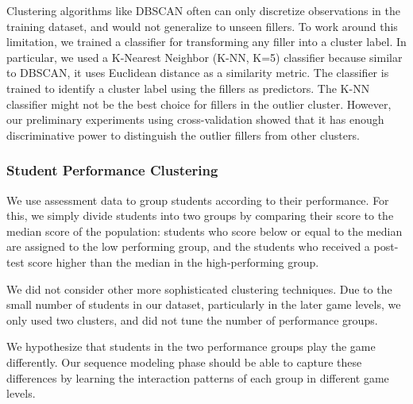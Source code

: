 \documentclass{sigchi}
\begin{document}
	Clustering algorithms like DBSCAN often can only discretize observations in the training dataset, and would not generalize to unseen fillers.
	To work around this limitation, we trained a classifier for transforming any filler into a cluster label. 
	In particular, we used a K-Nearest Neighbor (K-NN, K=5) classifier because similar to DBSCAN, it uses Euclidean distance as a similarity metric.
	The classifier is trained to identify a cluster label using the fillers as predictors.
	The K-NN classifier might not be the best choice for fillers in the outlier cluster. 
	However, our preliminary experiments using cross-validation showed that it has enough discriminative power to distinguish the outlier fillers from other clusters.
	
	\subsubsection{Student Performance Clustering}
	\label{sec:student_disc}

We use assessment data to group students according to their performance.
For this, we simply  divide students into two groups by comparing their score to the median score of the population:
 students who score below or equal to the median are assigned to the low performing group, and the students who received a post-test score higher than the median in the high-performing group.
 
We did not consider other more sophisticated clustering techniques.
Due to the small number of students in our dataset, particularly in the later game levels, we only
used two clusters, and did not tune the number of performance groups. 

We hypothesize that students in the two  performance groups play the game differently. 
Our sequence modeling phase should be able to capture these differences
by learning the interaction patterns of each group in different game levels.

	
\end{document}
